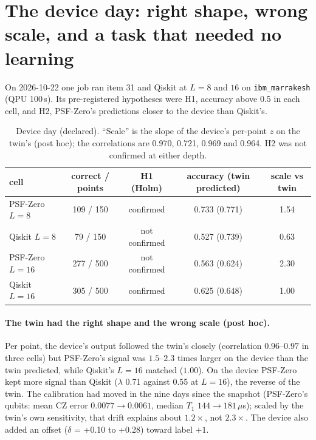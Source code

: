 \documentclass[11pt]{article}
\begin{document}
\section{The device day: right shape, wrong scale, and a task that needed no learning}
\label{sec:device}

On 2026-10-22 one job ran item 31 and Qiskit at $L = 8$ and $16$ on \texttt{ibm\_marrakesh} (QPU 100\,s). Its
pre-registered hypotheses were H1, accuracy above 0.5 in each cell, and H2, PSF-Zero's predictions closer to the
device than Qiskit's.

\begin{table}[h]
\centering
\small
\begin{tabular}{lcccc}
\toprule
cell & correct / points & H1 (Holm) & accuracy (twin predicted) & scale vs twin \\
\midrule
PSF-Zero $L=8$ & 109 / 150 & confirmed & 0.733 (0.771) & 1.54 \\
Qiskit $L=8$ & 79 / 150 & not confirmed & 0.527 (0.739) & 0.63 \\
PSF-Zero $L=16$ & 277 / 500 & not confirmed & 0.563 (0.624) & 2.30 \\
Qiskit $L=16$ & 305 / 500 & confirmed & 0.625 (0.648) & 1.00 \\
\bottomrule
\end{tabular}
\caption{Device day (declared). ``Scale'' is the slope of the device's per-point $z$ on the twin's (post hoc); the
correlations are 0.970, 0.721, 0.969 and 0.964. H2 was not confirmed at either depth.}
\label{tab:device}
\end{table}

\paragraph{The twin had the right shape and the wrong scale (post hoc).} Per point, the device's output followed the
twin's closely (correlation $0.96$--$0.97$ in three cells) but PSF-Zero's signal was $1.5$--$2.3$ times larger on the
device than the twin predicted, while Qiskit's $L = 16$ matched ($1.00$). On the device PSF-Zero kept more signal than
Qiskit ($\lambda$ 0.71 against 0.55 at $L = 16$), the reverse of the twin. The calibration had moved in the nine days
since the snapshot (PSF-Zero's qubits: mean CZ error $0.0077 \to 0.0061$, median $T_1$ $144 \to 181\,\mu$s); scaled by
the twin's own sensitivity, that drift explains about $1.2\times$, not $2.3\times$. The device also added an offset
($\delta$ = +0.10 to +0.28) toward label $+1$.
\end{document}
